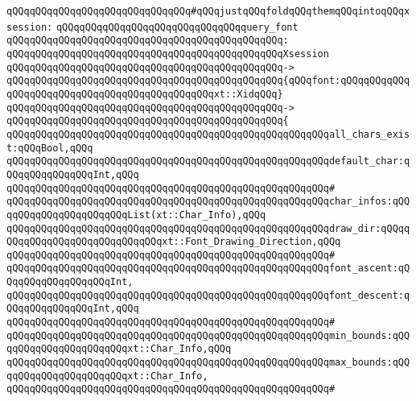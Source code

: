 \verb|qQQqqQQqqQQqqQQqqQQqqQQqqQQqqQQq#qQQqjustqQQqfoldqQQqthemqQQqintoqQQqxsession:|\newline
\newline
\verb|qQQqqQQqqQQqqQQqqQQqqQQqqQQqqQQqquery_font|\newline
\verb|qQQqqQQqqQQqqQQqqQQqqQQqqQQqqQQqqQQqqQQqqQQqqQQq:|\newline
\verb|qQQqqQQqqQQqqQQqqQQqqQQqqQQqqQQqqQQqqQQqqQQqqQQqXsession|\newline
\verb|qQQqqQQqqQQqqQQqqQQqqQQqqQQqqQQqqQQqqQQqqQQqqQQq->|\newline
\verb|qQQqqQQqqQQqqQQqqQQqqQQqqQQqqQQqqQQqqQQqqQQqqQQq{qQQqfont:qQQqqQQqqQQqqQQqqQQqqQQqqQQqqQQqqQQqqQQqqQQqqQQqxt::XidqQQq}|\newline
\verb|qQQqqQQqqQQqqQQqqQQqqQQqqQQqqQQqqQQqqQQqqQQqqQQq->|\newline
\verb|qQQqqQQqqQQqqQQqqQQqqQQqqQQqqQQqqQQqqQQqqQQqqQQq{|\newline
\verb|qQQqqQQqqQQqqQQqqQQqqQQqqQQqqQQqqQQqqQQqqQQqqQQqqQQqqQQqall_chars_exist:qQQqBool,qQQq|\newline
\verb|qQQqqQQqqQQqqQQqqQQqqQQqqQQqqQQqqQQqqQQqqQQqqQQqqQQqqQQqdefault_char:qQQqqQQqqQQqqQQqInt,qQQq|\newline
\verb|qQQqqQQqqQQqqQQqqQQqqQQqqQQqqQQqqQQqqQQqqQQqqQQqqQQqqQQq#|\newline
\verb|qQQqqQQqqQQqqQQqqQQqqQQqqQQqqQQqqQQqqQQqqQQqqQQqqQQqqQQqchar_infos:qQQqqQQqqQQqqQQqqQQqqQQqList(xt::Char_Info),qQQq|\newline
\verb|qQQqqQQqqQQqqQQqqQQqqQQqqQQqqQQqqQQqqQQqqQQqqQQqqQQqqQQqdraw_dir:qQQqqQQqqQQqqQQqqQQqqQQqqQQqqQQqxt::Font_Drawing_Direction,qQQq|\newline
\verb|qQQqqQQqqQQqqQQqqQQqqQQqqQQqqQQqqQQqqQQqqQQqqQQqqQQqqQQq#|\newline
\verb|qQQqqQQqqQQqqQQqqQQqqQQqqQQqqQQqqQQqqQQqqQQqqQQqqQQqqQQqfont_ascent:qQQqqQQqqQQqqQQqqQQqInt,|\newline
\verb|qQQqqQQqqQQqqQQqqQQqqQQqqQQqqQQqqQQqqQQqqQQqqQQqqQQqqQQqfont_descent:qQQqqQQqqQQqqQQqInt,qQQq|\newline
\verb|qQQqqQQqqQQqqQQqqQQqqQQqqQQqqQQqqQQqqQQqqQQqqQQqqQQqqQQq#|\newline
\verb|qQQqqQQqqQQqqQQqqQQqqQQqqQQqqQQqqQQqqQQqqQQqqQQqqQQqqQQqmin_bounds:qQQqqQQqqQQqqQQqqQQqqQQqxt::Char_Info,qQQq|\newline
\verb|qQQqqQQqqQQqqQQqqQQqqQQqqQQqqQQqqQQqqQQqqQQqqQQqqQQqqQQqmax_bounds:qQQqqQQqqQQqqQQqqQQqqQQqxt::Char_Info,|\newline
\verb|qQQqqQQqqQQqqQQqqQQqqQQqqQQqqQQqqQQqqQQqqQQqqQQqqQQqqQQq#|\newline
